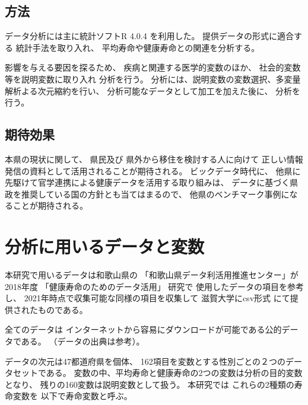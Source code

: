 \section{方法}
データ分析には主に統計ソフトR 4.0.4
を利用した。
提供データの形式に適合する
統計手法を取り入れ、
平均寿命や健康寿命との関連を分析する。

影響を与える要因を探るため、
疾病と関連する医学的変数のほか、 社会的変数等を説明変数に取り入れ
分析を行う。
分析には、説明変数の変数選択、多変量解析よる次元縮約を行い、
分析可能なデータとして加工を加えた後に、
分析を行う。




\section{期待効果}

本県の現状に関して、
県民及び
県外から移住を検討する人に向けて
正しい情報発信の資料として活用されることが期待される。
ビックデータ時代に、 他県に先駆けて官学連携による健康データを活用する取り組みは、 データに基づく県政を推奨している国の方針とも当てはまるので、 他県のベンチマーク事例になることが期待される。



\chapter{分析に用いるデータと変数}\label{chapter:data}

本研究で用いるデータは和歌山県の
「和歌山県データ利活用推進センター」が
2018年度
「健康寿命のためのデータ活用」
研究で
使用したデータの項目を参考し、
2021年時点で収集可能な同様の項目を収集して
滋賀大学にcsv形式
にて提供されたものである。


全てのデータは
インターネットから容易にダウンロードが可能である公的データである。
（データの出典は参考）。



データの次元は47都道府県を個体、
162項目を変数とする性別ごとの２つのデータセットである。
変数の中、平均寿命と健康寿命の2つの変数は分析の目的変数となり、
残りの160変数は説明変数として扱う。
本研究では
これらの2種類の寿命変数を
以下で寿命変数と呼ぶ。

